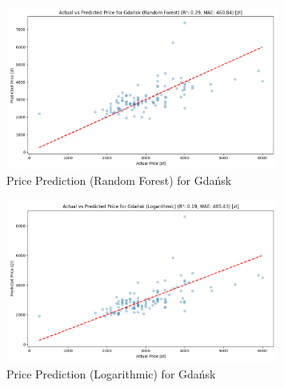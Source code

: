 \begin{figure}[H]
    \centering
    \includegraphics[width=0.8\textwidth]{figures/gdansk_price_prediction_rf.png}
    \caption{Price Prediction (Random Forest) for Gdańsk}
\end{figure}
\begin{figure}[H]
    \centering
    \includegraphics[width=0.8\textwidth]{figures/gdansk_price_prediction_logarithmic.png}
    \caption{Price Prediction (Logarithmic) for Gdańsk}
\end{figure}

